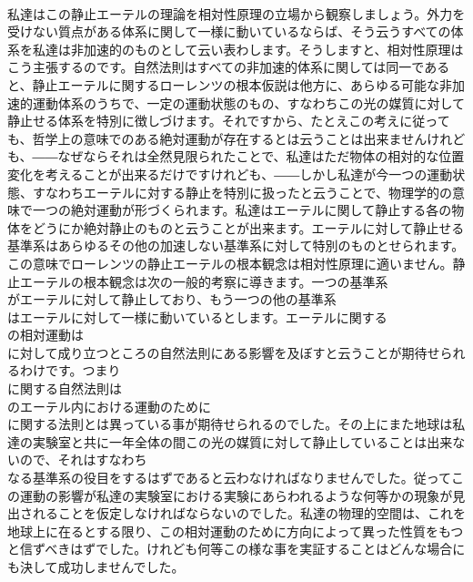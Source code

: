 \documentclass[8pt]{extreport}
\begin{document}
\begin{CJK}{UTF8}{min}
\\	私達はこの静止エーテルの理論を相対性原理の立場から観察しましょう。外力を受けない質点がある体系に関して一様に動いているならば、そう云うすべての体系を私達は非加速的のものとして云い表わします。そうしますと、相対性原理はこう主張するのです。自然法則はすべての非加速的体系に関しては同一であると、静止エーテルに関するローレンツの根本仮説は他方に、あらゆる可能な非加速的運動体系のうちで、一定の運動状態のもの、すなわちこの光の媒質に対して静止せる体系を特別に徴しづけます。それですから、たとえこの考えに従っても、哲学上の意味でのある絶対運動が存在するとは云うことは出来ませんけれども、――なぜならそれは全然見限られたことで、私達はただ物体の相対的な位置変化を考えることが出来るだけですけれども、――しかし私達が今一つの運動状態、すなわちエーテルに対する静止を特別に扱ったと云うことで、物理学的の意味で一つの絶対運動が形づくられます。私達はエーテルに関して静止する各の物体をどうにか絶対静止のものと云うことが出来ます。エーテルに対して静止せる基準系はあらゆるその他の加速しない基準系に対して特別のものとせられます。この意味でローレンツの静止エーテルの根本観念は相対性原理に適いません。静止エーテルの根本観念は次の一般的考察に導きます。一つの基準系 
\\	がエーテルに対して静止しており、もう一つの他の基準系 
\\	はエーテルに対して一様に動いているとします。エーテルに関する 
\\	の相対運動は 
\\	に対して成り立つところの自然法則にある影響を及ぼすと云うことが期待せられるわけです。つまり 
\\	に関する自然法則は 
\\	のエーテル内における運動のために 
\\	に関する法則とは異っている事が期待せられるのでした。その上にまた地球は私達の実験室と共に一年全体の間この光の媒質に対して静止していることは出来ないので、それはすなわち 
\\	なる基準系の役目をするはずであると云わなければなりませんでした。従ってこの運動の影響が私達の実験室における実験にあらわれるような何等かの現象が見出されることを仮定しなければならないのでした。私達の物理的空間は、これを地球上に在るとする限り、この相対運動のために方向によって異った性質をもつと信ずべきはずでした。けれども何等この様な事を実証することはどんな場合にも決して成功しませんでした。

\end{CJK}
\end{document}

